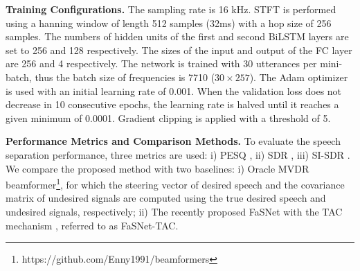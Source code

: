 \documentclass{article}
\begin{document}
\textbf{Training Configurations.}
\label{sec:modelcfg}
The sampling rate is 16 kHz.
STFT is performed using a hanning window of length 512 samples (32ms) with a hop size of 256 samples.
The numbers of hidden units of the first and second BiLSTM layers are set to 256 and 128 respectively.
The sizes of the input and output of the FC layer are 256 and 4 respectively.
The network is trained with 30 utterances per mini-batch, thus the batch size of frequencies is 7710 ($30 \times 257$).
The Adam \cite{kingma2015adam} optimizer is used with an initial learning rate of 0.001.
When the validation loss does not decrease in 10 consecutive epochs, the learning rate is halved until it reaches a given minimum of 0.0001.
Gradient clipping is applied with a threshold of 5.

\textbf{Performance Metrics and Comparison Methods.}
To evaluate the speech separation performance, three metrics are used: i) PESQ \cite{rix_perceptual_2001}, ii) SDR \cite{vincent_performance_2006}, iii) SI-SDR \cite{roux_sdr_2019}.
We compare the proposed method with two baselines: 
i) Oracle MVDR beamformer\footnote{https://github.com/Enny1991/beamformers}, for which the steering vector of desired speech and the covariance matrix of undesired signals are computed using the true desired speech and undesired signals, respectively; 
ii) The recently proposed FaSNet with the TAC mechanism \cite{luo_end--end_2020}, referred to as FaSNet-TAC.

\begin{table}[tbp]
    \caption{Speech separation results}
    \setlength{\tabcolsep}{1.0mm}{
    \vspace*{-3mm}
    \begin{tabular}{l|rrrr}
      Model & SDR & SI-SDR & NB-PESQ & WB-PESQ\\
      \hline
      Mixture & 0.18 & 0.00 & 2.05 & 1.6 \\
      Oracle MVDR & 12.19 & 11.70 & 3.21 & 2.68 \\
      FaSNet-TAC \cite{luo_end--end_2020} & 12.81 & 12.26 & 2.92 & 2.49 \\
      prop. with corr & 12.59 & 11.09 & 3.14 & 2.68 \\
      prop. & \textbf{13.89} & \textbf{13.26} & \textbf{3.31} & \textbf{2.87} \\
    \end{tabular}
    }
  \label{t1}
\end{table}
\end{document}
